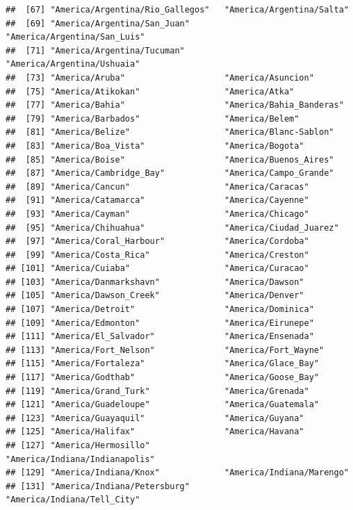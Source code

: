 \documentclass[
]{book}
\begin{document}
\begin{verbatim}
##  [67] "America/Argentina/Rio_Gallegos"   "America/Argentina/Salta"         
##  [69] "America/Argentina/San_Juan"       "America/Argentina/San_Luis"      
##  [71] "America/Argentina/Tucuman"        "America/Argentina/Ushuaia"       
##  [73] "America/Aruba"                    "America/Asuncion"                
##  [75] "America/Atikokan"                 "America/Atka"                    
##  [77] "America/Bahia"                    "America/Bahia_Banderas"          
##  [79] "America/Barbados"                 "America/Belem"                   
##  [81] "America/Belize"                   "America/Blanc-Sablon"            
##  [83] "America/Boa_Vista"                "America/Bogota"                  
##  [85] "America/Boise"                    "America/Buenos_Aires"            
##  [87] "America/Cambridge_Bay"            "America/Campo_Grande"            
##  [89] "America/Cancun"                   "America/Caracas"                 
##  [91] "America/Catamarca"                "America/Cayenne"                 
##  [93] "America/Cayman"                   "America/Chicago"                 
##  [95] "America/Chihuahua"                "America/Ciudad_Juarez"           
##  [97] "America/Coral_Harbour"            "America/Cordoba"                 
##  [99] "America/Costa_Rica"               "America/Creston"                 
## [101] "America/Cuiaba"                   "America/Curacao"                 
## [103] "America/Danmarkshavn"             "America/Dawson"                  
## [105] "America/Dawson_Creek"             "America/Denver"                  
## [107] "America/Detroit"                  "America/Dominica"                
## [109] "America/Edmonton"                 "America/Eirunepe"                
## [111] "America/El_Salvador"              "America/Ensenada"                
## [113] "America/Fort_Nelson"              "America/Fort_Wayne"              
## [115] "America/Fortaleza"                "America/Glace_Bay"               
## [117] "America/Godthab"                  "America/Goose_Bay"               
## [119] "America/Grand_Turk"               "America/Grenada"                 
## [121] "America/Guadeloupe"               "America/Guatemala"               
## [123] "America/Guayaquil"                "America/Guyana"                  
## [125] "America/Halifax"                  "America/Havana"                  
## [127] "America/Hermosillo"               "America/Indiana/Indianapolis"    
## [129] "America/Indiana/Knox"             "America/Indiana/Marengo"         
## [131] "America/Indiana/Petersburg"       "America/Indiana/Tell_City"       

\end{verbatim}
\end{document}
